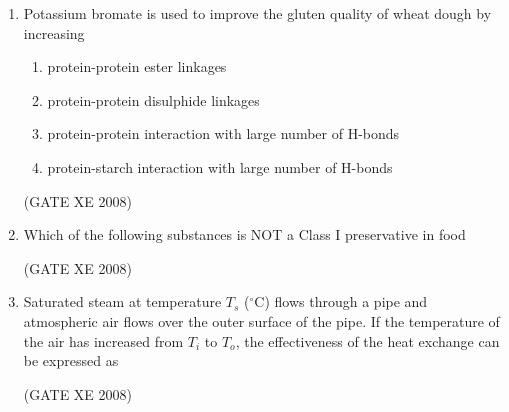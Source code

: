 \documentclass[12pt]{article}
\begin{document}
\begin{enumerate}
    (GATE XE 2008)

    \item Potassium bromate is used to improve the gluten quality of wheat dough by increasing 

\begin{enumerate}
\item  protein-protein ester linkages 
\item  protein-protein disulphide linkages 
\item  protein-protein interaction with large number of H-bonds 
\item  protein-starch interaction with large number of H-bonds 
\end{enumerate}
    
    (GATE XE 2008)

    \item Which of the following substances is NOT a Class I preservative in food 

\begin{enumerate}
\end{enumerate}
    
    (GATE XE 2008)

    \item Saturated steam at temperature $T_s$ ($^\circ$C) flows through a pipe and atmospheric air flows over the outer surface of the pipe. If the temperature of the air has increased from $T_i$ to $T_o$, the effectiveness of the heat exchange can be expressed as 

\begin{enumerate}
\end{enumerate}
    
    (GATE XE 2008)


\end{enumerate}
\end{document}

